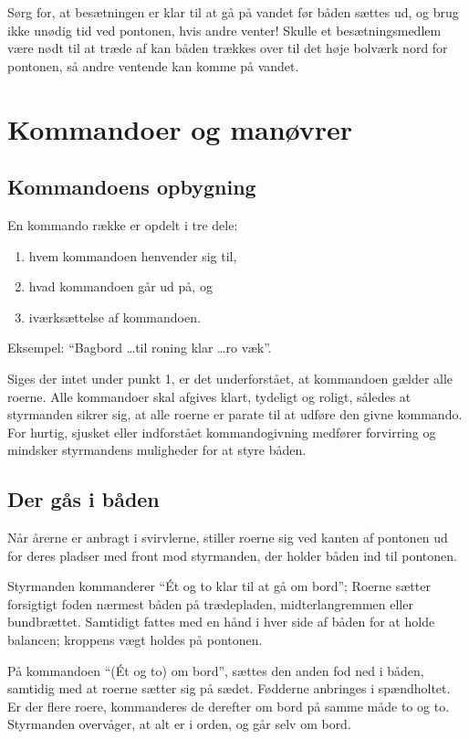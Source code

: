 \documentclass{article}
\begin{document}
Sørg for, at besætningen er klar til at gå på vandet før båden sættes ud,
og brug ikke unødig tid ved pontonen, hvis andre venter! Skulle et
besætningsmedlem være nødt til at træde af kan båden trækkes over til det
høje bolværk nord for pontonen, så andre ventende kan komme på vandet.

\section{Kommandoer og manøvrer}

\subsection{Kommandoens opbygning}

En kommando række er opdelt i tre dele:

\begin{enumerate}
    \item hvem kommandoen henvender sig til,
    \item hvad kommandoen går ud på, og
    \item iværksættelse af kommandoen.
\end{enumerate}

Eksempel: ``Bagbord \ldots til roning klar \ldots ro væk''.

Siges der intet under punkt 1, er det underforstået, at kommandoen gælder
alle roerne. Alle kommandoer skal afgives klart, tydeligt og roligt,
således at styrmanden sikrer sig, at alle roerne er parate til at udføre
den givne kommando. For hurtig, sjusket eller indforstået kommandogivning
medfører forvirring og mindsker styrmandens muligheder for at styre
båden.

\subsection{Der gås i båden}

Når årerne er anbragt i svirvlerne, stiller roerne sig ved kanten af
pontonen ud for deres pladser med front mod styrmanden, der holder båden
ind til pontonen.

Styrmanden kommanderer ``Ét og to klar til at gå om bord''; Roerne sætter
forsigtigt foden nærmest båden på trædepladen, midterlangremmen eller
bundbrættet. Samtidigt fattes med en hånd i hver side af båden for at
holde balancen; kroppens vægt holdes på pontonen.

På kommandoen ``(Ét og to) om bord'', sættes den anden fod ned i båden,
samtidig med at roerne sætter sig på sædet. Fødderne anbringes i
spændholtet.  Er der flere roere, kommanderes de derefter om bord på
samme måde to og to.  Styrmanden overvåger, at alt er i orden, og går
selv om bord.
\end{document}
